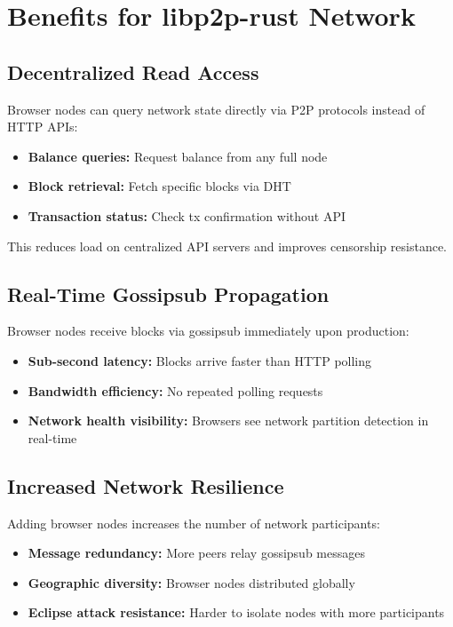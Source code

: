 \documentclass[11pt,a4paper]{article}
\begin{document}
\section{Benefits for libp2p-rust Network}

\subsection{Decentralized Read Access}

Browser nodes can query network state directly via P2P protocols instead of HTTP APIs:

\begin{itemize}
    \item \textbf{Balance queries:} Request balance from any full node
    \item \textbf{Block retrieval:} Fetch specific blocks via DHT
    \item \textbf{Transaction status:} Check tx confirmation without API
\end{itemize}

This reduces load on centralized API servers and improves censorship resistance.

\subsection{Real-Time Gossipsub Propagation}

Browser nodes receive blocks via gossipsub immediately upon production:

\begin{itemize}
    \item \textbf{Sub-second latency:} Blocks arrive faster than HTTP polling
    \item \textbf{Bandwidth efficiency:} No repeated polling requests
    \item \textbf{Network health visibility:} Browsers see network partition detection in real-time
\end{itemize}

\subsection{Increased Network Resilience}

Adding browser nodes increases the number of network participants:

\begin{itemize}
    \item \textbf{Message redundancy:} More peers relay gossipsub messages
    \item \textbf{Geographic diversity:} Browser nodes distributed globally
    \item \textbf{Eclipse attack resistance:} Harder to isolate nodes with more participants
\end{itemize}
\end{document}
